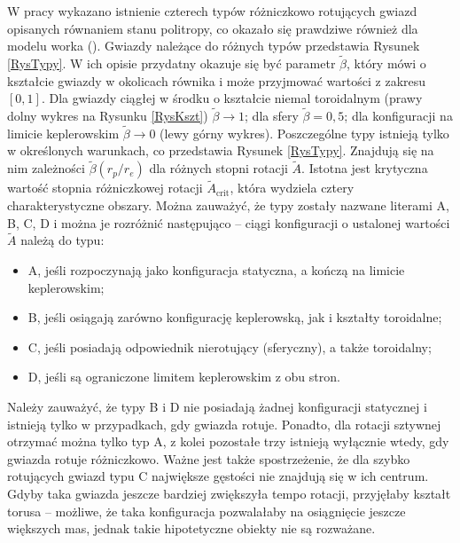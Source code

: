 \documentclass{bachelor_thesis}
\begin{document}
        \indent W pracy \cite{Ansorg2009} wykazano istnienie czterech typów różniczkowo rotujących gwiazd opisanych równaniem stanu politropy, co okazało się prawdziwe również dla modelu worka (\citealp{Szkudlarek2019}). Gwiazdy należące do różnych typów przedstawia Rysunek \ref{RysTypy}. W ich opisie przydatny okazuje się być parametr $\tilde{\beta}$, który mówi o kształcie gwiazdy w okolicach równika i może przyjmować wartości z zakresu $[0,1]$. Dla gwiazdy ciągłej w środku o kształcie niemal toroidalnym (prawy dolny wykres na Rysunku \ref{RysKszt}) $\tilde{\beta}\rightarrow 1$; dla sfery $\tilde{\beta}=0,5$; dla konfiguracji na limicie keplerowskim $\tilde{\beta}\rightarrow 0$ (lewy górny wykres). Poszczególne typy istnieją tylko w określonych warunkach, co przedstawia Rysunek \ref{RysTypy}. Znajdują się na nim zależności $\tilde{\beta}(r_p/r_e)$ dla różnych stopni rotacji $\tilde{A}$. Istotna jest krytyczna wartość stopnia różniczkowej rotacji $\tilde{A}_{\textrm{crit}}$, która wydziela cztery charakterystyczne obszary. Można zauważyć, że typy zostały nazwane literami A, B, C, D i można je rozróżnić następująco -- ciągi konfiguracji o ustalonej wartości $\tilde{A}$ należą do typu:
        \begin{itemize}
            \item A, jeśli rozpoczynają jako konfiguracja statyczna, a kończą na limicie keplerowskim;
            \item B, jeśli osiągają zarówno konfigurację keplerowską, jak i kształty toroidalne;
            \item C, jeśli posiadają odpowiednik nierotujący (sferyczny), a także toroidalny;
            \item D, jeśli są ograniczone limitem keplerowskim z obu stron.
        \end{itemize}
        Należy zauważyć, że typy B i D nie posiadają żadnej konfiguracji statycznej i istnieją tylko w przypadkach, gdy gwiazda rotuje. Ponadto, dla rotacji sztywnej otrzymać można tylko typ A, z kolei pozostałe trzy istnieją wyłącznie wtedy, gdy gwiazda rotuje różniczkowo. Ważne jest także spostrzeżenie, że dla szybko rotujących gwiazd typu C największe gęstości nie znajdują się w ich centrum. Gdyby taka gwiazda jeszcze bardziej zwiększyła tempo rotacji, przyjęłaby kształt torusa -- możliwe, że taka konfiguracja pozwalałaby na osiągnięcie jeszcze większych mas, jednak takie hipotetyczne obiekty nie są rozważane.
\end{document}
